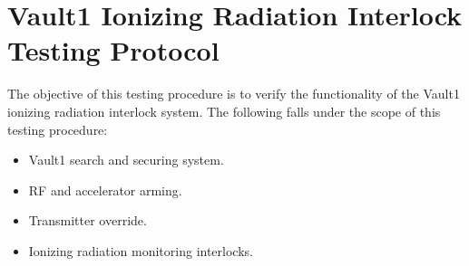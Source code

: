 \documentclass[letterpaper,10pt,english]{sphinxmanual}
\begin{document}
\sphinxstepscope


\section{Vault\sphinxhyphen{}1 Ionizing Radiation Interlock Testing Protocol}
\label{\detokenize{testing_documentation/Vault-1_ionizing_radiation:vault-1-ionizing-radiation-interlock-testing-protocol}}\label{\detokenize{testing_documentation/Vault-1_ionizing_radiation::doc}}
\sphinxAtStartPar
The objective of this testing procedure is to verify the functionality of the Vault\sphinxhyphen{}1 ionizing radiation interlock system.
The following falls under the scope of this testing procedure:
\begin{itemize}
\item {} 
\sphinxAtStartPar
Vault\sphinxhyphen{}1 search and securing system.

\item {} 
\sphinxAtStartPar
RF and accelerator arming.

\item {} 
\sphinxAtStartPar
Transmitter override.

\item {} 
\sphinxAtStartPar
Ionizing radiation monitoring interlocks.

\end{itemize}
\end{document}
